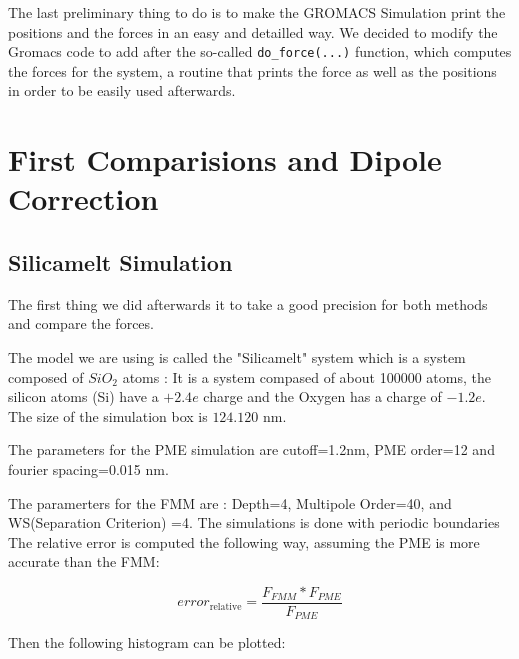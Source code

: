 \documentclass[10pt,twoside,a4paper]{report}
\begin{document}
The last preliminary thing to do is to make the GROMACS Simulation print the positions and the forces in an easy and detailled way. We decided to modify the Gromacs code to add after the so-called {\tt{do\_force(...)}} function, which computes the forces for the system, a routine that prints the force as well as the positions in order to be
 easily used afterwards. 

\section{First Comparisions and Dipole Correction}

\subsection{Silicamelt Simulation}

The first thing we did afterwards it to take a good precision for both methods and compare the forces.

The model we are using is called the "Silicamelt" system which is a system composed of $SiO_2$ atoms : It is a system compased of about 100000 atoms, the silicon atoms (Si) have a $+2.4e$ charge and the Oxygen has a charge of $-1.2e$.
The size of the simulation box is $124.120$ nm.

The parameters for the PME simulation are cutoff=1.2nm, PME order=12 and fourier spacing=0.015 nm. 

The paramerters for the FMM are : Depth=4, Multipole Order=40, and WS(Separation Criterion) =4. The simulations is done with periodic boundaries \\

The relative error is computed the following way, assuming the PME is more accurate than the FMM:

\begin{equation}
	error_{\text{relative}} = \frac{F_{FMM} * F_{PME}}{F_{PME}}
\end{equation}

Then the following histogram can be plotted:
\end{document}
